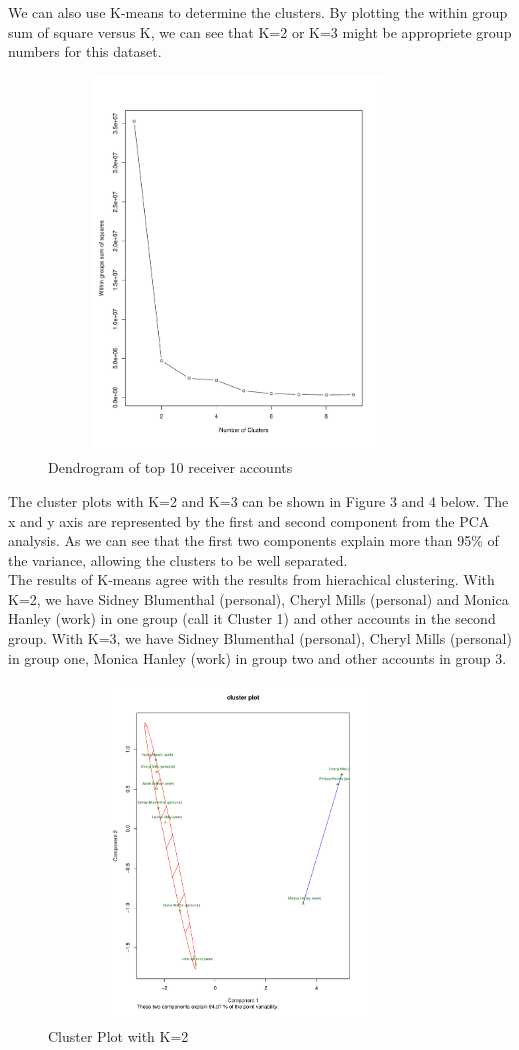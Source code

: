 We can also use K-means to determine the clusters. By plotting the within group sum of square versus K, we can see that K=2 or K=3 might be appropriete group numbers for this dataset.
\begin{figure}[h!]
    \centering
    \includegraphics[width=10cm,height=10cm]
    {daitong_and_yihe/clusterd.pdf}
    \caption{Dendrogram of top 10 receiver accounts}
\end{figure}


The cluster plots with K=2 and K=3 can be shown in Figure 3 and 4 below. The x and y axis are represented by the first and second component from the PCA analysis. As we can see that the first two components explain more than 95\% of the variance, allowing the clusters to be well separated. 
\\
The results of K-means agree with the results from hierachical clustering. With K=2, we have Sidney Blumenthal (personal), Cheryl Mills (personal) and Monica Hanley (work) in one group (call it Cluster 1) and other accounts in the second group. With K=3, we have Sidney Blumenthal (personal), Cheryl Mills (personal) in group one, Monica Hanley (work) in group two and other accounts in group 3.

\begin{figure}[h!]
    \centering
    \includegraphics[width=10cm,height=9cm]
    {daitong_and_yihe/c2.pdf}
    \caption{Cluster Plot with K=2}
\end{figure}

